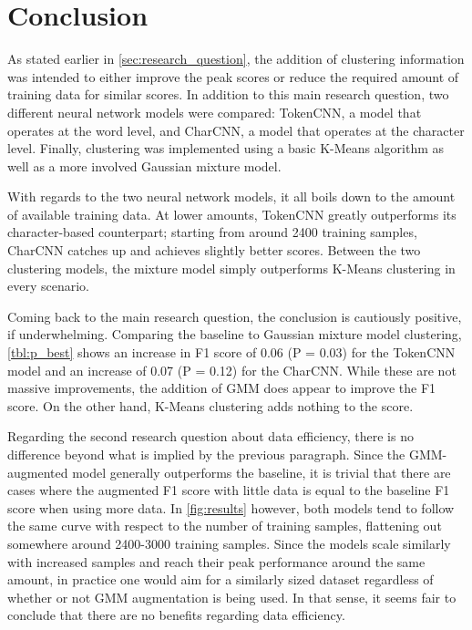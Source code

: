 \section{Conclusion}
As stated earlier in \cref{sec:research_question}, the addition of clustering
information was intended to either improve the peak scores or reduce the
required amount of training data for similar scores. In addition to this main
research question, two different neural network models were compared: TokenCNN,
a model that operates at the word level, and CharCNN, a model that operates at
the character level.  Finally, clustering was implemented using a basic K-Means
algorithm as well as a more involved Gaussian mixture model.

With regards to the two neural network models, it all boils down to the amount
of available training data. At lower amounts, TokenCNN greatly outperforms its
character-based counterpart; starting from around 2400 training samples, CharCNN
catches up and achieves slightly better scores. Between the two clustering
models, the mixture model simply outperforms K-Means clustering in every
scenario.

Coming back to the main research question, the conclusion is cautiously
positive, if underwhelming. Comparing the baseline to Gaussian mixture model
clustering, \cref{tbl:p_best} shows an increase in F1 score of 0.06 (P = 0.03)
for the TokenCNN model and an increase of 0.07 (P = 0.12) for the CharCNN. While
these are not massive improvements, the addition of GMM does appear to improve
the F1 score. On the other hand, K-Means clustering adds nothing to the score.

Regarding the second research question about data efficiency, there is no
difference beyond what is implied by the previous paragraph. Since the
GMM-augmented model generally outperforms the baseline, it is trivial that there
are cases where the augmented F1 score with little data is equal to the baseline
F1 score when using more data. In \cref{fig:results} however, both models tend
to follow the same curve with respect to the number of training samples,
flattening out somewhere around 2400-3000 training samples. Since the models
scale similarly with increased samples and reach their peak performance around
the same amount, in practice one would aim for a similarly sized dataset
regardless of whether or not GMM augmentation is being used. In that sense, it
seems fair to conclude that there are no benefits regarding data efficiency.

